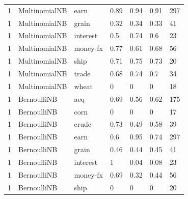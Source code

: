 \documentclass{article}
\begin{document}
\begin{table}[h]
\begin{tabular}{lllllll}
1             & MultinomialNB          & earn            & 0.89               & 0.94            & 0.91              & 297              \\
1             & MultinomialNB          & grain           & 0.32               & 0.34            & 0.33              & 41               \\
1             & MultinomialNB          & interest        & 0.5                & 0.74            & 0.6               & 23               \\
1             & MultinomialNB          & money-fx        & 0.77               & 0.61            & 0.68              & 56               \\
1             & MultinomialNB          & ship            & 0.71               & 0.75            & 0.73              & 20               \\
1             & MultinomialNB          & trade           & 0.68               & 0.74            & 0.7               & 34               \\
1             & MultinomialNB          & wheat           & 0                  & 0               & 0                 & 18               \\
1             & BernoulliNB            & acq             & 0.69               & 0.56            & 0.62              & 175              \\
1             & BernoulliNB            & corn            & 0                  & 0               & 0                 & 17               \\
1             & BernoulliNB            & crude           & 0.73               & 0.49            & 0.58              & 39               \\
1             & BernoulliNB            & earn            & 0.6                & 0.95            & 0.74              & 297              \\
1             & BernoulliNB            & grain           & 0.46               & 0.44            & 0.45              & 41               \\
1             & BernoulliNB            & interest        & 1                  & 0.04            & 0.08              & 23               \\
1             & BernoulliNB            & money-fx        & 0.69               & 0.32            & 0.44              & 56               \\
1             & BernoulliNB            & ship            & 0                  & 0               & 0                 & 20               \\

\end{tabular}
\end{table}
\end{document}
